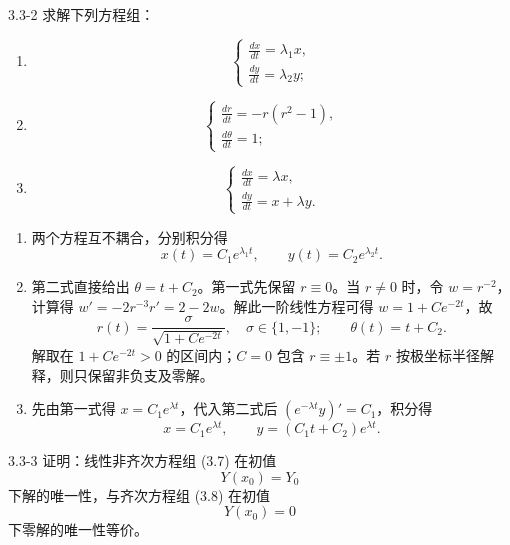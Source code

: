 \documentclass[UTF8,a4paper,11pt]{ctexart}
\begin{document}
\begin{problem}{3.3-2}
求解下列方程组：
  \begin{enumerate}[label=(\arabic*)]
    \item
    \[
    \begin{cases}
      \displaystyle \frac{dx}{dt}=\lambda_1x,\\[5pt]
      \displaystyle \frac{dy}{dt}=\lambda_2y;
    \end{cases}
    \]

    \item
    \[
    \begin{cases}
      \displaystyle \frac{dr}{dt}=-r(r^2-1),\\[5pt]
      \displaystyle \frac{d\theta}{dt}=1;
    \end{cases}
    \]

    \item
    \[
    \begin{cases}
      \displaystyle \frac{dx}{dt}=\lambda x,\\[5pt]
      \displaystyle \frac{dy}{dt}=x+\lambda y.
    \end{cases}
    \]
  \end{enumerate}
\end{problem}

\begin{solution}
\begin{enumerate}[label=(\arabic*)]
\item 两个方程互不耦合，分别积分得
\[\boxed{x(t)=C_1e^{\lambda_1t},\qquad y(t)=C_2e^{\lambda_2t}}.\]
\item 第二式直接给出 $\theta=t+C_2$。第一式先保留 $r\equiv0$。当 $r\ne0$ 时，令 $w=r^{-2}$，计算得
$w'=-2r^{-3}r'=2-2w$。解此一阶线性方程可得 $w=1+Ce^{-2t}$，故
\[
\boxed{r(t)=\frac{\sigma}{\sqrt{1+Ce^{-2t}}},\quad \sigma\in\{1,-1\};
\qquad\theta(t)=t+C_2.}
\]
解取在 $1+Ce^{-2t}>0$ 的区间内；$C=0$ 包含 $r\equiv\pm1$。若 $r$ 按极坐标半径解释，则只保留非负支及零解。
\item 先由第一式得 $x=C_1e^{\lambda t}$，代入第二式后
$(e^{-\lambda t}y)'=C_1$，积分得
\[\boxed{x=C_1e^{\lambda t},\qquad y=(C_1t+C_2)e^{\lambda t}}.\]
\end{enumerate}
\end{solution}

\begin{problem}{3.3-3}
证明：线性非齐次方程组 (3.7) 在初值
  \[
    Y(x_0)=Y_0
  \]
  下解的唯一性，与齐次方程组 (3.8) 在初值
  \[
    Y(x_0)=0
  \]
  下零解的唯一性等价。
\end{problem}
\end{document}

